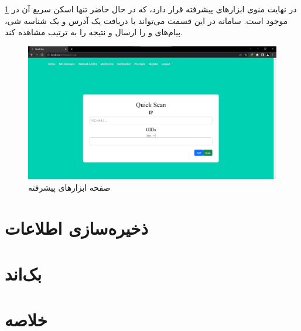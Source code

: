 

در نهایت منوی ابزارهای پیشرفته قرار دارد، که در حال حاضر تنها اسکن سریع آن در \cref{fig.120} موجود است. سامانه در این قسمت می‌تواند با دریافت یک آدرس و یک شناسه شی، پیام‌های  و  را ارسال و نتیجه را به ترتیب مشاهده کند. 

\begin{figure}[!h]
    \centering\includegraphics[scale=.38]{./pro-tools}
    \caption{صفحه ابزارهای پیشرفته}\label{fig.120}
\end{figure}




\section{ذخیره‌سازی اطلاعات}





\section{بک‌اند}





\section{خلاصه}
